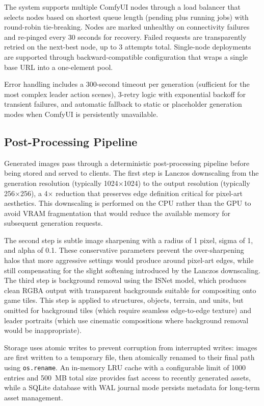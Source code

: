 \documentclass[conference]{IEEEtran}
\begin{document}
The system supports multiple ComfyUI nodes through a load balancer that selects nodes based on shortest queue length (pending plus running jobs) with round-robin tie-breaking. Nodes are marked unhealthy on connectivity failures and re-pinged every 30 seconds for recovery. Failed requests are transparently retried on the next-best node, up to 3 attempts total. Single-node deployments are supported through backward-compatible configuration that wraps a single base URL into a one-element pool.

Error handling includes a 300-second timeout per generation (sufficient for the most complex leader action scenes), 3-retry logic with exponential backoff for transient failures, and automatic fallback to static or placeholder generation modes when ComfyUI is persistently unavailable.

\subsection{Post-Processing Pipeline}

Generated images pass through a deterministic post-processing pipeline before being stored and served to clients. The first step is Lanczos downscaling from the generation resolution (typically 1024$\times$1024) to the output resolution (typically 256$\times$256), a 4$\times$ reduction that preserves edge definition critical for pixel-art aesthetics. This downscaling is performed on the CPU rather than the GPU to avoid VRAM fragmentation that would reduce the available memory for subsequent generation requests.

The second step is subtle image sharpening with a radius of 1 pixel, sigma of 1, and alpha of 0.1. These conservative parameters prevent the over-sharpening halos that more aggressive settings would produce around pixel-art edges, while still compensating for the slight softening introduced by the Lanczos downscaling. The third step is background removal using the ISNet model, which produces clean RGBA output with transparent backgrounds suitable for compositing onto game tiles. This step is applied to structures, objects, terrain, and units, but omitted for background tiles (which require seamless edge-to-edge texture) and leader portraits (which use cinematic compositions where background removal would be inappropriate).

Storage uses atomic writes to prevent corruption from interrupted writes: images are first written to a temporary file, then atomically renamed to their final path using \texttt{os.rename}. An in-memory LRU cache with a configurable limit of 1000 entries and 500~MB total size provides fast access to recently generated assets, while a SQLite database with WAL journal mode persists metadata for long-term asset management.
\end{document}
